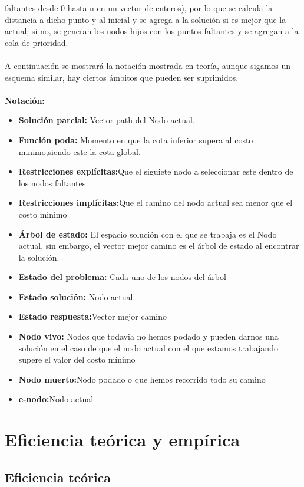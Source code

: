 \documentclass[11pt,openany]{book}
\begin{document}
faltantes desde 0 hasta n en un vector de enteros), por lo que se calcula la distancia a dicho punto y al inicial y se agrega a la solución si es 
mejor que la actual; si no, se generan los nodos hijos con los puntos faltantes y se agregan a la cola de prioridad.
\\ \\
A continuación se mostrará la notación mostrada en teoría, aunque sigamos un esquema similar, hay ciertos ámbitos que pueden ser suprimidos.
\\\\
\textbf{Notación:}
\begin{itemize}
      \item \textbf{Solución parcial:} Vector path del Nodo actual.
      \item \textbf{Función poda:} Momento en que la cota inferior supera al costo minimo,siendo este la cota global.
      \item \textbf{Restricciones explícitas:}Que el siguiete nodo a seleccionar este dentro de los nodos faltantes
      \item \textbf{Restricciones implícitas:}Que el camino del nodo actual sea menor que el costo minimo
      \item \textbf{Árbol de estado:} El espacio solución con el que se trabaja es el Nodo actual, sin embargo, el 
      vector mejor camino es el árbol de estado al encontrar la solución.
      \item \textbf{Estado del problema:} Cada uno de los nodos del árbol
      \item \textbf{Estado solución:} Nodo actual
      \item \textbf{Estado respuesta:}Vector mejor camino
      \item \textbf{Nodo vivo:} Nodos que todavia no hemos podado y pueden darnos una solución en el caso de que el nodo actual con el que
      estamos trabajando supere el valor del costo mínimo 
      \item \textbf{Nodo muerto:}Nodo podado o que hemos recorrido todo su camino
      \item \textbf{e-nodo:}Nodo actual
\end{itemize}


\newpage


\section{Eficiencia teórica y empírica}
\subsection{Eficiencia teórica}
\end{document}
